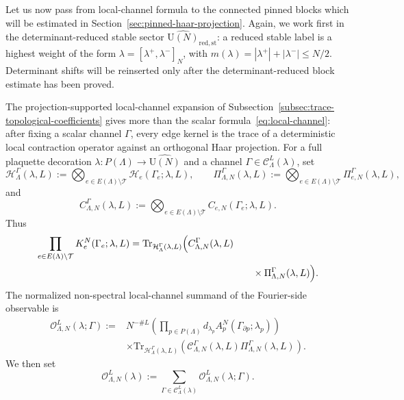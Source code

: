 \documentclass[11pt,a4paper,reqno]{amsart}
\theoremstyle{definition}
\theoremstyle{remark}
\newcommand\U{{\mathrm U}}
\newcommand\Tr{{\mathrm{Tr}}}
\begin{document}
Let us now pass from local-channel formula to the connected pinned blocks which will be estimated in Section~\ref{sec:pinned-haar-projection}. Again, we work first in the determinant-reduced stable sector $\widehat{\U(N)}_{\mathrm{red},\mathrm{st}}$: a reduced stable label is a highest weight of the form $\lambda=[\lambda^+,\lambda^-]_N$, with $m(\lambda)=|\lambda^+|+|\lambda^-|\le N/2$.  Determinant shifts will be reinserted only after the determinant-reduced block estimate has been proved.

The projection-supported local-channel expansion of Subsection~\ref{subsec:trace-topological-coefficients} gives more than the scalar formula~\eqref{eq:local-channel}: after fixing a scalar channel $\Gamma$, every edge kernel is the trace of a deterministic local contraction operator against an orthogonal Haar projection.  For a full plaquette decoration $\lambda:P(\Lambda)\to\widehat{\U(N)}$ and a channel $\Gamma\in\mathcal C_\Lambda^L(\lambda)$, set
\[
\mathcal H^\Gamma_\Lambda(\lambda,L)
:=
\bigotimes_{e\in E(\Lambda)\setminus\mathcal T}
\mathcal H_e(\Gamma_e;\lambda,L),
\qquad
\Pi^\Gamma_{\Lambda,N}(\lambda,L)
:=
\bigotimes_{e\in E(\Lambda)\setminus\mathcal T}
\Pi^\Gamma_{e,N}(\lambda,L),
\]
and
\[
C^\Gamma_{\Lambda,N}(\lambda,L):=\bigotimes_{e\in E(\Lambda)\setminus\mathcal T}C_{e,N}(\Gamma_e;\lambda,L).
\]
Thus
\[
\begin{aligned}
\prod_{e\in E(\Lambda)\setminus\mathcal T}K_e^N(\Gamma_e;\lambda,L)
&=\Tr_{\mathcal H^\Gamma_\Lambda(\lambda,L)}\Bigl(
C^\Gamma_{\Lambda,N}(\lambda,L)\\
&\hspace{4.5cm}\times
\Pi^\Gamma_{\Lambda,N}(\lambda,L)\Bigr).
\end{aligned}
\]
The normalized non-spectral local-channel summand of the Fourier-side observable is
\begin{equation}\label{eq:observable-channel-summand}
\begin{aligned}
\mathcal O^L_{\Lambda,N}(\lambda;\Gamma)
:={}&N^{-\#L}
\left(
\prod_{p\in P(\Lambda)}d_{\lambda_p}A_p^N(\Gamma_{\partial p};\lambda_p)
\right)\\
&\times
\Tr_{\mathcal H^\Gamma_\Lambda(\lambda,L)}
\left(
\mathcal C^\Gamma_{\Lambda,N}(\lambda,L)
\Pi^\Gamma_{\Lambda,N}(\lambda,L)
\right).
\end{aligned}
\end{equation}
We then set
\begin{equation}\label{eq:local-channel-observable}
\mathcal O^L_{\Lambda,N}(\lambda)
:=
\sum_{\Gamma\in\mathcal C_\Lambda^L(\lambda)}
\mathcal O^L_{\Lambda,N}(\lambda;\Gamma).
\end{equation}
\end{document}
